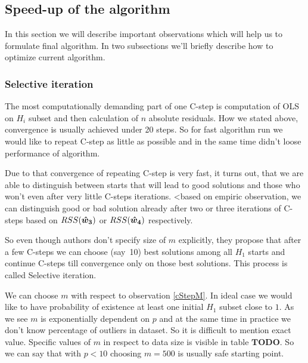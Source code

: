
\subsection{Speed-up of the algorithm}
In this section we will describe important observations which will help us to formulate final algorithm. In two subsections we'll briefly describe how to optimize current algorithm. 

\subsubsection{Selective iteration}
The most computationally demanding part of one C-step is computation of OLS on $H_i$ subset and then 
calculation of $n$ absolute residuals. How we stated above, convergence is usually achieved under 20 steps. 
So for fast algorithm run we would like to repeat C-step as little as possible and in the same time didn't loose performance of algorithm. 

Due to that convergence of repeating C-step is very fast, it turns out, that we are able to distinguish between starts that will lead to good solutions and those who won't even after very little C-steps iterations. <based on empiric observation, we can distinguish good or bad solution already after two or three iterations of C-steps based on $RSS(\boldsymbol{\hat{w}_3})$ or $RSS(\boldsymbol{\hat{w}_4})$ respectively. 

So even though authors don't specify size of $m$ explicitly, they propose that after a few C-steps we can choose (say~10) best solutions among all $H_1$ starts and continue C-steps till convergence only on those best solutions.
This process is called Selective iteration.

\begin{itshape}
	We can choose $m$ with respect to observation \ref{cStepM}. In ideal case we would like to have probability of existence at least one initial $H_1$ subset close to $1$. As we see $m$ is exponentially dependent on $p$ and at the same time in practice we don't know percentage of outliers in dataset. So it is difficult to mention exact value. Specific values of $m$ in respect to data size is visible in table $\boldsymbol{TODO}$. So we can say that with $p < 10$ choosing $m = 500$ is usually safe starting point.
\end{itshape}

